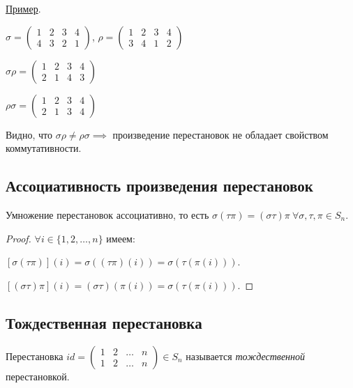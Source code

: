 \underline{Пример}.

$\sigma = \begin{pmatrix}
    1 & 2 & 3 & 4 \\
    4 & 3 & 2 & 1
\end{pmatrix}$, $\rho = \begin{pmatrix}
    1 & 2 & 3 & 4 \\
    3 & 4 & 1 & 2
\end{pmatrix}$

$\sigma \rho = \begin{pmatrix}
    1 & 2 & 3 & 4 \\
    2 & 1 & 4 & 3
\end{pmatrix}$

$\rho \sigma = \begin{pmatrix}
    1 & 2 & 3 & 4 \\
    2 & 1 & 3 & 4
\end{pmatrix}$

Видно, что $\sigma \rho \neq \rho \sigma \implies$ произведение перестановок не обладает свойством коммутативности.

\subsection{Ассоциативность произведения перестановок}
\begin{proposition}
    Умножение перестановок ассоциативно, то есть $\sigma (\tau \pi) = (\sigma \tau) \pi \ \forall \sigma, \tau, \pi \in S_n$.
\end{proposition}

\begin{proof}
    $\forall i \in \{1, 2, \dots, n\}$ имеем:

    $[\sigma(\tau \pi)](i) = \sigma((\tau \pi)(i)) = \sigma(\tau(\pi(i)))$.

    $[(\sigma \tau) \pi](i) = (\sigma \tau)(\pi(i)) = \sigma(\tau(\pi(i)))$.
\end{proof}


\subsection{Тождественная перестановка}
\begin{definition}
    Перестановка $id = \begin{pmatrix}
        1 & 2 & \dots & n \\
        1 & 2 & \dots & n
    \end{pmatrix} \in S_n$ называется \textit{тождественной} перестановкой.
\end{definition}

